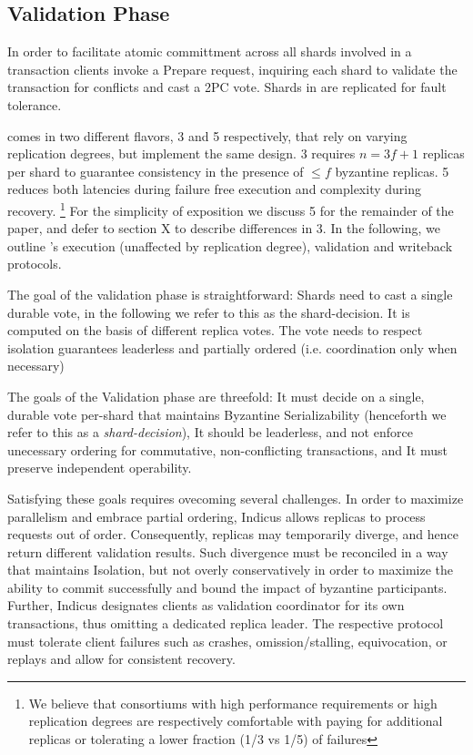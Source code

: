 \subsection{Validation Phase}

In order to facilitate atomic committment across all shards involved in a transaction \sys clients invoke a Prepare request, inquiring each shard to validate the transaction for conflicts and cast a 2PC vote. Shards in \sys are replicated for fault tolerance.

\sys comes in two different flavors, \sys{}3 and \sys{}5 respectively, that rely on varying replication degrees, but implement the same design. \sys{}3 requires $n=3f+1$ replicas  per shard to guarantee consistency in the presence of $\leq f$ byzantine replicas. \sys{}5 reduces both latencies during failure free execution and complexity during recovery. \footnote{We believe that consortiums with high performance requirements or high replication degrees are respectively comfortable with paying for additional replicas or tolerating a lower fraction (1/3 vs 1/5) of failures}
For the simplicity of exposition we discuss \sys{}5 for the remainder of the paper, and defer to section X  to describe differences in \sys{}3. In the following, we outline \sys 's execution (unaffected by replication degree), validation and writeback protocols.

The goal of the validation phase is straightforward:
Shards need to cast a single durable vote, in the following we refer to this as the shard-decision. It is computed on the basis of different replica votes.
The vote needs to respect isolation guarantees
leaderless and partially ordered (i.e. coordination only when necessary)



The goals of the Validation phase are threefold: \one It must decide on a single, durable vote per-shard that maintains Byzantine Serializability (henceforth we refer to this as a \textit{shard-decision}), \two It should be leaderless, and not enforce unecessary ordering for commutative, non-conflicting transactions, and \three It must preserve independent operability. 

Satisfying these goals requires ovecoming several challenges. In order to maximize parallelism and embrace partial ordering, Indicus allows replicas to process requests out of order. Consequently, replicas may temporarily diverge, and hence return different validation results. Such divergence must be reconciled in a way that maintains Isolation, but not overly conservatively in order to maximize the ability to commit successfully and bound the impact of byzantine participants. Further, Indicus designates clients as validation coordinator for its own transactions, thus omitting a dedicated replica leader. The respective protocol must tolerate client failures such as crashes, omission/stalling, equivocation, or replays and allow for consistent recovery. 

